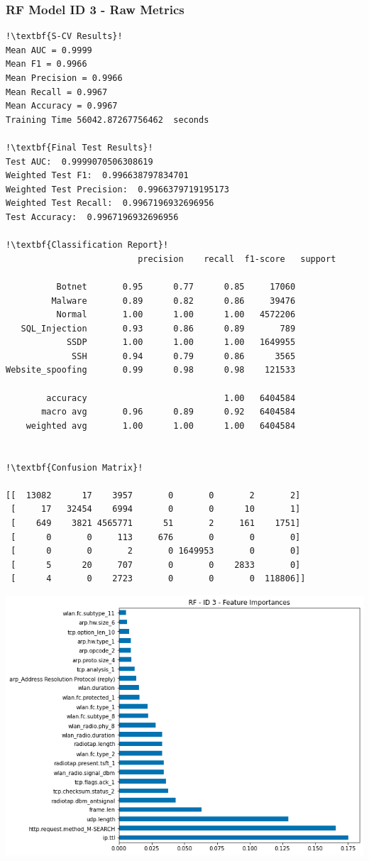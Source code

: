 \begin{appendices}
\newpage
\subsubsection{RF Model ID 3 - Raw Metrics}
\begin{lstlisting}[escapechar=!]
!\textbf{S-CV Results}!
Mean AUC = 0.9999
Mean F1 = 0.9966
Mean Precision = 0.9966
Mean Recall = 0.9967
Mean Accuracy = 0.9967
Training Time 56042.87267756462  seconds

!\textbf{Final Test Results}!
Test AUC:  0.9999070506308619
Weighted Test F1:  0.996638797834701
Weighted Test Precision:  0.9966379719195173
Weighted Test Recall:  0.9967196932696956
Test Accuracy:  0.9967196932696956

!\textbf{Classification Report}!
				          precision    recall  f1-score   support
				  
          Botnet       0.95      0.77      0.85     17060
         Malware       0.89      0.82      0.86     39476
          Normal       1.00      1.00      1.00   4572206
   SQL_Injection       0.93      0.86      0.89       789
            SSDP       1.00      1.00      1.00   1649955
             SSH       0.94      0.79      0.86      3565
Website_spoofing       0.99      0.98      0.98    121533

        accuracy                           1.00   6404584
       macro avg       0.96      0.89      0.92   6404584
    weighted avg       1.00      1.00      1.00   6404584
    
    
!\textbf{Confusion Matrix}!

[[  13082      17    3957       0       0       2       2]
 [     17   32454    6994       0       0      10       1]
 [    649    3821 4565771      51       2     161    1751]
 [      0       0     113     676       0       0       0]
 [      0       0       2       0 1649953       0       0]
 [      5      20     707       0       0    2833       0]
 [      4       0    2723       0       0       0  118806]]
\end{lstlisting}
\begin{center}
	\centering
	\includegraphics[width=\textwidth]{Appendices/Images/RF/Model3/RF_Model3_FI.png}
\end{center}


\end{appendices}
